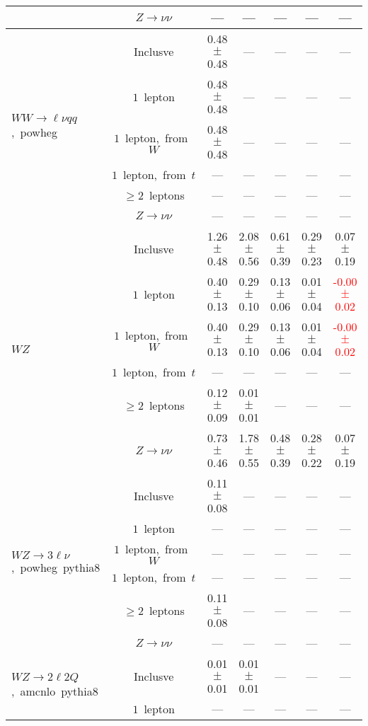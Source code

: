 \documentclass{article}
\begin{document}
\begin{longtable}{|l|c|c|c|c|c|c|}
 & $Z\rightarrow\nu\nu$  & ---  & ---  & ---  & ---  & --- \\* 
\hline 
\multirow{6}{*}{$WW{\rightarrow}{\ell}{\nu}qq$,~powheg} & Inclusve  & 0.48 $\pm$ 0.48  & ---  & ---  & ---  & --- \\* 
 & $1$~lepton  & 0.48 $\pm$ 0.48  & ---  & ---  & ---  & --- \\* 
 & $1$~lepton,~from~$W$  & 0.48 $\pm$ 0.48  & ---  & ---  & ---  & --- \\* 
 & $1$~lepton,~from~$t$  & ---  & ---  & ---  & ---  & --- \\* 
 & $\ge2$~leptons  & ---  & ---  & ---  & ---  & --- \\* 
 & $Z\rightarrow\nu\nu$  & ---  & ---  & ---  & ---  & --- \\* 
\hline 
\multirow{6}{*}{$WZ$} & Inclusve  & 1.26 $\pm$ 0.48  & 2.08 $\pm$ 0.56  & 0.61 $\pm$ 0.39  & 0.29 $\pm$ 0.23  & 0.07 $\pm$ 0.19 \\* 
 & $1$~lepton  & 0.40 $\pm$ 0.13  & 0.29 $\pm$ 0.10  & 0.13 $\pm$ 0.06  & 0.01 $\pm$ 0.04  & \textcolor{red}{ -0.00 $\pm$ 0.02 } \\* 
 & $1$~lepton,~from~$W$  & 0.40 $\pm$ 0.13  & 0.29 $\pm$ 0.10  & 0.13 $\pm$ 0.06  & 0.01 $\pm$ 0.04  & \textcolor{red}{ -0.00 $\pm$ 0.02 } \\* 
 & $1$~lepton,~from~$t$  & ---  & ---  & ---  & ---  & --- \\* 
 & $\ge2$~leptons  & 0.12 $\pm$ 0.09  & 0.01 $\pm$ 0.01  & ---  & ---  & --- \\* 
 & $Z\rightarrow\nu\nu$  & 0.73 $\pm$ 0.46  & 1.78 $\pm$ 0.55  & 0.48 $\pm$ 0.39  & 0.28 $\pm$ 0.22  & 0.07 $\pm$ 0.19 \\* 
\hline 
\multirow{6}{*}{$WZ{\rightarrow}3\ell\nu$,~powheg~pythia8} & Inclusve  & 0.11 $\pm$ 0.08  & ---  & ---  & ---  & --- \\* 
 & $1$~lepton  & ---  & ---  & ---  & ---  & --- \\* 
 & $1$~lepton,~from~$W$  & ---  & ---  & ---  & ---  & --- \\* 
 & $1$~lepton,~from~$t$  & ---  & ---  & ---  & ---  & --- \\* 
 & $\ge2$~leptons  & 0.11 $\pm$ 0.08  & ---  & ---  & ---  & --- \\* 
 & $Z\rightarrow\nu\nu$  & ---  & ---  & ---  & ---  & --- \\* 
\hline 
\multirow{6}{*}{$WZ{\rightarrow}2{\ell}2Q$,~amcnlo~pythia8} & Inclusve  & 0.01 $\pm$ 0.01  & 0.01 $\pm$ 0.01  & ---  & ---  & --- \\* 
 & $1$~lepton  & ---  & ---  & ---  & ---  & --- \\* 

\end{longtable}
\end{document}
